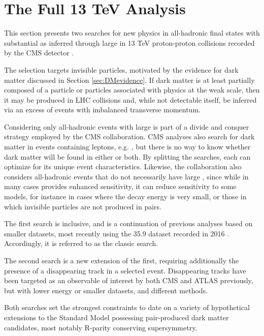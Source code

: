 \chapter{The Full 13 TeV \mttwo Analysis} \label{sec:analysis}

This section presents two searches for new physics in all-hadronic final states with substantial \met as inferred through large \mttwo in 13 TeV proton-proton collisions recorded by the CMS detector \cite{MT2_2019}.

The \met selection targets invisible particles, motivated by the evidence for dark matter discussed in Section \ref{sec:DMevidence}.
If dark matter is at least partially composed of a particle or particles associated with physics at the weak scale, then it may be produced in LHC collisions and, while not detectable itself, be inferred via an excess of events with imbalanced transverse momentum.

Considering only all-hadronic events with large \mttwo is part of a divide and conquer strategy employed by the CMS collaboration.
CMS analyses also search for dark matter in events containing leptons, e.g. \cite{cms1lep}, but there is no way to know whether dark matter will be found in either or both.
By splitting the searches, each can optimize for its unique event characteristics.
Likewise, the collaboration also considers all-hadronic events that do not necessarily have large \mttwo \cite{ra2b}, since while \mttwo in many cases provides enhanced sensitivity, it can reduce sensitivity to some models, for instance in cases where the decay energy is very small, or those in which invisible particles are not produced in pairs.

The first search is inclusive, and is a continuation of previous analyses based on smaller datasets, most recently using the 35.9 \fbinv dataset recorded in 2016 \cite{MT2_2016}.
Accordingly, it is referred to as the classic search.

The second search is a new extension of the first, requiring additionally the presence of a disappearing track in a selected event.
Disappearing tracks have been targeted as an observable of interest by both CMS \cite{cmsdistracks_8tev, cmsdistracks_13tev} and ATLAS \cite{atlasdistracks_8tev, atlasdistracks_13tev} previously, but with lower energy or smaller datasets, and different methods.

Both searches set the strongest constraints to date on a variety of hypothetical extensions to the Standard Model possessing pair-produced dark matter candidates, most notably R-parity conserving supersymmetry.

